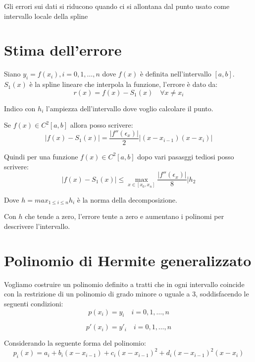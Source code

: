 Gli errori sui dati si riducono quando ci si allontana dal punto usato come intervallo locale della spline

\section{Stima dell'errore}

Siano $y_i = f(x_i), i = 0, 1, \dots, n$ dove $f(x)$ è definita nell'intervallo $[a, b]$.
$S_1(x)$ è la spline lineare che interpola la funzione, l'errore è dato da:
\begin{equation}
  r(x) = f(x) - S_1(x) \quad \forall x \neq x_i
\end{equation}

Indico con $h_i$ l'ampiezza dell'intervallo dove voglio calcolare il punto.

Se $f(x) \in C^2[a, b]$ allora posso scrivere:
\begin{equation}
  | f(x) - S_1(x) | = \displaystyle\frac{|f''(\epsilon_x)|}{2} |(x-x_{i-1})(x-x_i)|
\end{equation}

Quindi per una funzione $f(x) \in C^2[a, b]$ dopo vari pasasggi tediosi posso scrivere:
\begin{equation}
  | f(x) - S_1(x) | \leq \max_{x \in [x_0, x_n]} \displaystyle\frac{|f''(\epsilon_x)|}{8} | h_2
\end{equation}

Dove $h = max_{1\leq i \leq n} h_i$ è la norma della decomposizione.

Con $h$ che tende a zero, l'errore tente a zero e aumentano i polinomi per descrivere l'intervallo.

\section{Polinomio di Hermite generalizzato}

Vogliamo costruire un polinomio definito a tratti che in ogni intervallo coincide con 
la restrizione di un polinomio di grado minore o uguale a 3, soddisfacendo le seguenti condizioni:
\begin{equation}
  p(x_i) = y_i \quad i = 0, 1, \dots, n
\end{equation}


\begin{equation}
  p'(x_i) = y'_i \quad i = 0, 1, \dots, n
\end{equation}

Considerando la seguente forma del polinomio:
\begin{equation}
  p_i(x) = a_i + b_i(x - x_{i-1}) + c_i(x-x_{i-1})^2 + d_i(x- x_{i-1})^2(x-x_i)
  \label{eq:hermite_generale}
\end{equation}

